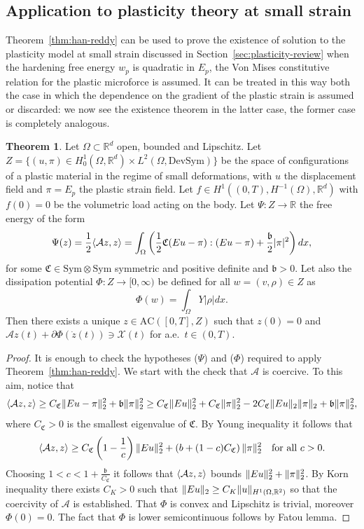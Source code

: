 \documentclass[a4paper,10pt,twoside]{amsbook}
\numberwithin{section}{chapter}
\numberwithin{equation}{chapter}
\theoremstyle{definition}
\newtheorem{thm}[prop]{Theorem}
\DeclarePairedDelimiter{\norm}{\lVert}{\rVert}
\DeclarePairedDelimiter{\dual}{\langle}{\rangle}
\begin{document}
\subsection{Application to plasticity theory at small strain}

Theorem~\ref{thm:han-reddy} can be used to prove the existence of solution to the plasticity model at small strain discussed in Section~\ref{sec:plasticity-review} when the hardening free energy $w_p$ is quadratic in $E_p$, the Von Mises constitutive relation for the plastic microforce is assumed. It can be treated in this way both the case in which the dependence on the gradient of the plastic strain is assumed or discarded: we now see the existence theorem in the latter case, the former case is completely analogous.
\begin{thm}
Let $\Omega\subset\mathbb{R}^d$ open, bounded and Lipschitz. Let $Z=\{(u,\pi)\in H^1_0(\Omega,\mathbb{R}^d)\times L^2(\Omega,\text{DevSym})\}$ be the space of configurations of a plastic material in the regime of small deformations, with $u$ the displacement field and $\pi=E_p$ the plastic strain field. Let $f\in H^1((0,T),H^{-1}(\Omega),\mathbb{R}^d)$ with $f(0)=0$ be the volumetric load acting on the body. Let $\Psi\colon Z\to\mathbb{R}$ the free energy of the form
\[
\Psi(z)=\frac{1}{2}\dual{\mathcal{A}z,z}=\int_\Omega\left(\frac{1}{2}\mathfrak{C}(Eu-\pi):(Eu-\pi)+\frac{\mathfrak{b}}{2}|\pi|^2\right)dx,
\]
for some $\mathfrak{C}\in\text{Sym}\otimes\text{Sym}$ symmetric and positive definite and $\mathfrak{b}>0$. Let also the dissipation potential $\Phi\colon Z\to[0,\infty)$ be defined for all $w=(v,\rho)\in Z$ as
\[
\Phi(w)=\int_\Omega Y|\rho|dx.
\]
Then there exists a unique $z\in\text{AC}([0,T],Z)$ such that $z(0)=0$ and $\mathcal{A}z(t)+\partial\Phi(\dot z(t))\ni\mathcal{X}(t)$ for a.e.\ $t\in(0,T)$.
\end{thm}
\begin{proof}
It is enough to check the hypotheses ($\Psi$)  and ($\Phi$) required to apply Theorem~\ref{thm:han-reddy}. We start with the check that $\mathcal{A}$ is coercive. To this aim, notice that
\[
\dual{\mathcal{A}z,z}\ge C_\mathfrak{C}\norm{Eu-\pi}_2^2+\mathfrak{b}\norm{\pi}_2^2\ge C_\mathfrak{C}\norm{Eu}_2^2+C_\mathfrak{C}\norm{\pi}_2^2-2C_\mathfrak{C}\norm{Eu}_2\norm{\pi}_2+\mathfrak{b}\norm{\pi}_2^2,
\]
where $C_\mathfrak{C}>0$ is the smallest eigenvalue of $\mathfrak{C}$. By Young inequality it follows that
\[
\dual{\mathcal{A}z,z}\ge C_\mathfrak{C}\left(1-\frac{1}{c}\right)\norm{Eu}_2^2+\left(b+(1-c)C_\mathfrak{C}\right)\norm{\pi}_2^2\quad\text{for all $c>0$}.
\]
Choosing $1<c<1+\frac{\mathfrak{b}}{C_\mathfrak{C}}$ it follows that $\dual{\mathcal{A}z,z}$ bounds $\norm{Eu}_2^2+\norm{\pi}_2^2$. By Korn inequality there exists $C_K>0$ such that $\norm{Eu}_2\ge C_K\norm{u}_{H^1(\Omega,\mathbb{R}^2)}$ so that the coercivity of $\mathcal{A}$ is established. That $\Phi$ is convex and Lipschitz is trivial, moreover $\Phi(0)=0$. The fact that $\Phi$ is lower semicontinuous follows by Fatou lemma.
\end{proof}
\end{document}
